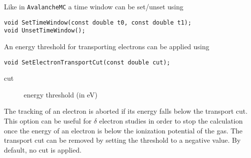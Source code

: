 Like in \texttt{AvalancheMC} a time window can be set/unset using
\begin{lstlisting}
void SetTimeWindow(const double t0, const double t1);
void UnsetTimeWindow();
\end{lstlisting}

An energy threshold for transporting electrons can be applied using 
\begin{lstlisting}
void SetElectronTransportCut(const double cut);
\end{lstlisting}
\begin{description}
  \item[cut] energy threshold (in eV)
\end{description}
The tracking of an electron is aborted if its energy falls below the 
transport cut. This option can be useful for \(\delta\) electron studies in 
order to stop the calculation once the energy of an electron 
is below the ionization potential of the gas. 
The transport cut can be removed by setting the threshold to a negative value.
By default, no cut is applied.

